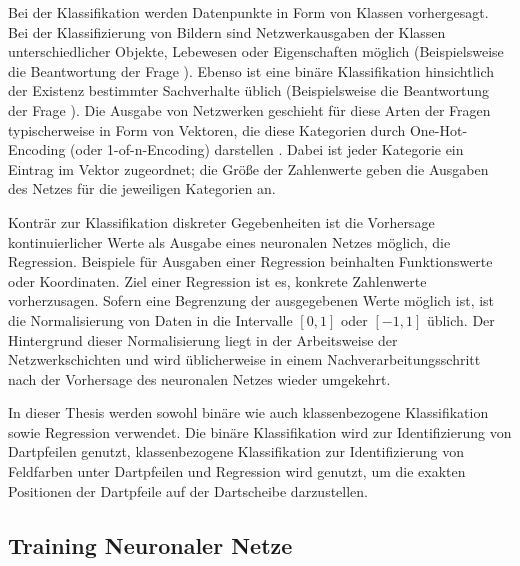 Bei der Klassifikation werden Datenpunkte in Form von Klassen vorhergesagt. Bei der Klassifizierung von Bildern sind Netzwerkausgaben der Klassen unterschiedlicher Objekte, Lebewesen oder Eigenschaften möglich (Beispielsweise die Beantwortung der Frage ). Ebenso ist eine binäre Klassifikation hinsichtlich der Existenz bestimmter Sachverhalte üblich (Beispielsweise die Beantwortung der Frage ). Die Ausgabe von Netzwerken geschieht für diese Arten der Fragen typischerweise in Form von Vektoren, die diese Kategorien durch One-Hot-Encoding (oder 1-of-n-Encoding) darstellen \cite{one_hot_encoding}. Dabei ist jeder Kategorie ein Eintrag im Vektor zugeordnet; die Größe der Zahlenwerte geben die Ausgaben des Netzes für die jeweiligen Kategorien an.

Konträr zur Klassifikation diskreter Gegebenheiten ist die Vorhersage kontinuierlicher Werte als Ausgabe eines neuronalen Netzes möglich, die Regression. Beispiele für Ausgaben einer Regression beinhalten Funktionswerte oder Koordinaten. Ziel einer Regression ist es, konkrete Zahlenwerte vorherzusagen. Sofern eine Begrenzung der ausgegebenen Werte möglich ist, ist die Normalisierung von Daten in die Intervalle $[0, 1]$ oder $[-1, 1]$ üblich. Der Hintergrund dieser Normalisierung liegt in der Arbeitsweise der Netzwerkschichten und wird üblicherweise in einem Nachverarbeitungsschritt nach der Vorhersage des neuronalen Netzes wieder umgekehrt.

In dieser Thesis werden sowohl binäre wie auch klassenbezogene Klassifikation sowie Regression verwendet. Die binäre Klassifikation wird zur Identifizierung von Dartpfeilen genutzt, klassenbezogene Klassifikation zur Identifizierung von Feldfarben unter Dartpfeilen und Regression wird genutzt, um die exakten Positionen der Dartpfeile auf der Dartscheibe darzustellen.


\subsection{Training Neuronaler Netze}
\label{sec:was_nn_training}

